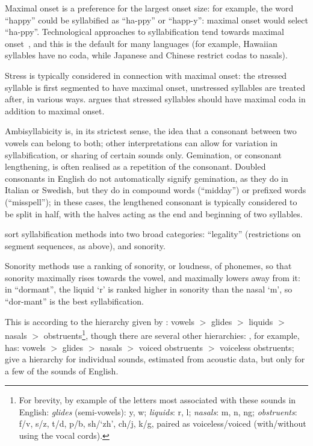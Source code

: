 \documentclass{article}[11pt]
\begin{document}
Maximal onset is a preference for the largest onset size: for example, the word ``happy'' could be syllabified as ``ha-ppy'' or ``happ-y'': maximal onset would select ``ha-ppy''. Technological approaches to syllabification tend towards maximal onset~\citep{ladefoged_course_2011}, and this is the default for many languages (for example, Hawaiian syllables have no coda, while Japanese and Chinese restrict codas to nasals).

Stress is typically considered in connection with maximal onset: the stressed syllable is first segmented to have maximal onset, unstressed syllables are treated after, in various ways. \citet{wells_syllabification_2019} argues 
that stressed syllables should have maximal coda in addition to maximal onset.

Ambisyllabicity is, in its strictest sense, the idea that a consonant between two vowels can belong to both; other interpretations can allow for variation in syllabification, or sharing of certain sounds only. Gemination, or consonant lengthening, is often realised as a repetition of the consonant. Doubled consonants in English do not automatically signify gemination, as they do in Italian or Swedish, but they do in compound words (``midday'') or prefixed words (``misspell''); in these cases, the lengthened consonant is typically considered to be split in half, with the halves acting as the end and beginning of two syllables.

\citet{goslin_comparing_2007} sort syllabification methods into two broad categories: ``legality'' (restrictions on segment sequences, as above), and sonority.

Sonority methods use a ranking of sonority, or loudness, of phonemes, so that sonority maximally rises towards the vowel, and maximally lowers away from it: in ``dormant'', the liquid `r' is ranked higher in sonority than the nasal `m', so ``dor-mant'' is the best syllabification.

This is according to the hierarchy given by \citet{kingston_role_1990}: vowels $>$ glides $>$ liquids $>$ nasals $>$ obstruents\footnote{For brevity, by example of the letters most associated with these sounds in English: \textit{glides} (semi-vowels): y, w; \textit{liquids}: r, l; \textit{nasals}: m, n, ng; \textit{obstruents}: f/v, s/z, t/d, p/b, sh/`zh', ch/j, k/g, paired as voiceless/voiced (with/without using the vocal cords).}, though there are several other hierarchies: \citet{katamba_introduction_1989}, for example, has: vowels $>$ glides $>$ nasals $>$ voiced obstruents $>$ voiceless obstruents; \citet{ladefoged_course_2011} give a hierarchy for individual sounds, estimated from acoustic data, but only for a few of the sounds of English.
\end{document}
